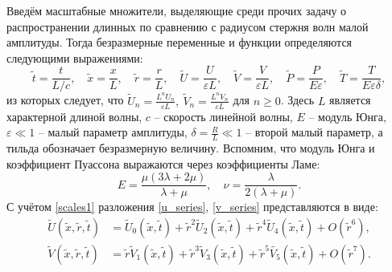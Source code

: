 \documentclass[12pt, a4paper]{report}
\begin{document}
Введём масштабные множители, выделяющие среди прочих задачу о распространении длинных по сравнению с радиусом стержня волн малой амплитуды. Тогда безразмерные переменные и функции определяются следующими выражениями:
\begin{equation} \label{scales1}
\tilde t = \frac{t}{L/c}, \quad \tilde x = \frac{x}{L}, \quad \tilde r = \frac{r}{L}, \quad \tilde U = \frac{U}{\varepsilon L}, \quad \tilde V = \frac{V}{\varepsilon L}, \quad \tilde P = \frac{P}{E \varepsilon}, \quad \tilde T = \frac{T}{E \varepsilon\delta},
\end{equation}
из которых следует, что
$\displaystyle \tilde U_n =  \frac{L^n U_n}{\varepsilon L},  \ \tilde V_n =  \frac{L^n V_n}{\varepsilon L}$ для $n \geqslant 0$.
Здесь $L$ является характерной длиной волны, $c$ -- скорость линейной волны, $E$ -- модуль Юнга, $\varepsilon \ll 1$ -- малый параметр амплитуды, $\displaystyle \delta = \frac{R}{L} \ll 1$ -- второй малый параметр, а тильда обозначает безразмерную величину. Вспомним, что модуль Юнга и коэффициент Пуассона выражаются через коэффициенты Ламе:
\begin{equation}\label{young_mod}
E = \frac{\mu(3\lambda + 2\mu)}{\lambda + \mu}, \quad \nu = \frac{\lambda}{2 (\lambda + \mu)}.
\end{equation}
С учётом \eqref{scales1} разложения \eqref{u_series}, \eqref{v_series} представляются в виде:
\begin{align}
\label{u_series_scaled}
\widetilde U(\tilde x, \tilde r, \tilde t) &= \widetilde{U}_0(\tilde x, \tilde t) + \tilde{r}^2\widetilde{U}_2(\tilde x, \tilde t) + \tilde{r}^4\widetilde{U}_4(\tilde x, \tilde t) + O(\tilde r^6),\\
\label{v_series_scaled}
\widetilde V(\tilde x, \tilde r, \tilde t) &= \tilde{r} \widetilde{V}_1(\tilde x, \tilde t) + \tilde{r}^3\widetilde{V}_3(\tilde x, \tilde t) + \tilde{r}^5\widetilde{V_5}(\tilde x, \tilde t) + O(\tilde r^7).
\end{align}
\end{document}
